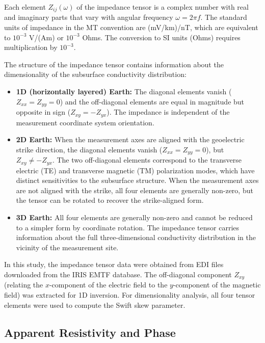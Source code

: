 Each element $Z_{ij}(\omega)$ of the impedance tensor is a complex number with real and imaginary parts that vary with angular frequency $\omega = 2\pi f$. The standard units of impedance in the MT convention are (mV/km)/nT, which are equivalent to $10^{-3}$ V/(Am) or $10^{-3}$ Ohms. The conversion to SI units (Ohms) requires multiplication by $10^{-3}$.

The structure of the impedance tensor contains information about the dimensionality of the subsurface conductivity distribution:

\begin{itemize}
    \item \textbf{1D (horizontally layered) Earth:} The diagonal elements vanish ($Z_{xx} = Z_{yy} = 0$) and the off-diagonal elements are equal in magnitude but opposite in sign ($Z_{xy} = -Z_{yx}$). The impedance is independent of the measurement coordinate system orientation.

    \item \textbf{2D Earth:} When the measurement axes are aligned with the geoelectric strike direction, the diagonal elements vanish ($Z_{xx} = Z_{yy} = 0$), but $Z_{xy} \neq -Z_{yx}$. The two off-diagonal elements correspond to the transverse electric (TE) and transverse magnetic (TM) polarization modes, which have distinct sensitivities to the subsurface structure. When the measurement axes are not aligned with the strike, all four elements are generally non-zero, but the tensor can be rotated to recover the strike-aligned form.

    \item \textbf{3D Earth:} All four elements are generally non-zero and cannot be reduced to a simpler form by coordinate rotation. The impedance tensor carries information about the full three-dimensional conductivity distribution in the vicinity of the measurement site.
\end{itemize}

In this study, the impedance tensor data were obtained from EDI files downloaded from the IRIS EMTF database. The off-diagonal component $Z_{xy}$ (relating the $x$-component of the electric field to the $y$-component of the magnetic field) was extracted for 1D inversion. For dimensionality analysis, all four tensor elements were used to compute the Swift skew parameter.

\subsection{Apparent Resistivity and Phase}

